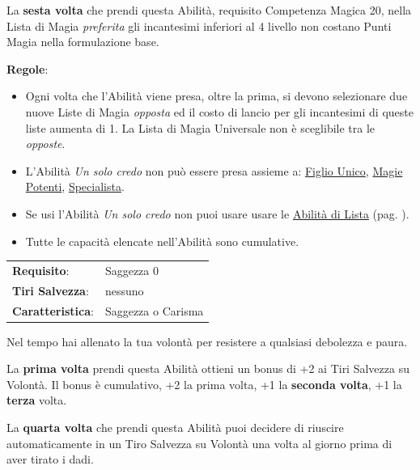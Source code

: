 \begin{multicols}{2}
La \textbf{sesta volta} che prendi questa Abilità, requisito Competenza Magica 20, nella Lista di Magia \emph{preferita} gli incantesimi inferiori al 4 livello non costano Punti Magia nella formulazione base.

\medskip

\textbf{Regole}:

\smallskip

\begin{itemize}[leftmargin=*] \setlength{\itemsep}{0pt}
\item Ogni volta che l'Abilità viene presa, oltre la prima, si devono selezionare due nuove Liste di Magia \emph{opposta} ed il costo di lancio per gli incantesimi di queste liste aumenta di 1.  La Lista di Magia Universale non è sceglibile tra le \emph{opposte}.

\item L'Abilità \emph{Un solo credo} non può essere presa assieme a: \hyperlink{figliounico}{Figlio Unico}, \hyperlink{magiepotenti}{Magie Potenti}, \hyperlink{specialista}{Specialista}.

\item Se usi l'Abilità \emph{Un solo credo} non puoi usare usare le \hyperlink{abilitadilista}{Abilità di Lista} (pag. \pageref{abilitadilista}).

\item Tutte le capacità elencate nell'Abilità sono cumulative.
\end{itemize}

\hspace{-0.2cm}\begin{tabularx}{\linewidth}{l@{\hspace{8pt}}X}
\rowcolor{gray!20}\textbf{Requisito}: & Saggezza 0\\
\textbf{Tiri Salvezza}: & nessuno\\
\rowcolor{gray!20}\textbf{Caratteristica}: & Saggezza o Carisma\\
\end{tabularx}\smallskip

Nel tempo hai allenato la tua volontà per resistere a qualsiasi debolezza e paura.

La \textbf{prima volta} prendi questa Abilità ottieni un bonus di +2 ai Tiri Salvezza su Volontà. Il bonus è cumulativo, +2 la prima volta, +1 la \textbf{seconda volta}, +1 la \textbf{terza} volta.

La \textbf{quarta volta} che prendi questa Abilità puoi decidere di riuscire automaticamente in un Tiro Salvezza su Volontà una volta al giorno prima di aver tirato i dadi.


\end{multicols}
